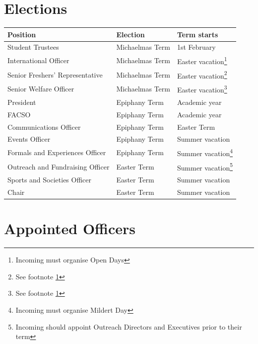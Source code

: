 \documentclass[12pt]{article}
\begin{document}
    \section{Elections}
    \begin{longtable}{|l|l|l|}
        \hline
        \textbf{Position} & \textbf{Election} & \textbf{Term starts} \\
        \hline\hline
        \endhead
        \hline
        \endfoot

        Student Trustees                        & Michaelmas Term           & 1st February \\
        International Officer                   & Michaelmas Term           & Easter vacation\footnote{\label{povds}Incoming must organise Open Days} \\
        Senior Freshers' Representative         & Michaelmas Term           & Easter vacation\footnote{See footnote \ref{povds}} \\
        Senior Welfare Officer                  & Michaelmas Term           & Easter vacation\footnote{See footnote \ref{povds}} \\

        President                               & Epiphany Term             & Academic year \\
        FACSO                                   & Epiphany Term             & Academic year \\
        Communications Officer                  & Epiphany Term             & Easter Term \\
        Events Officer                          & Epiphany Term             & Summer vacation \\
        Formals and Experiences Officer         & Epiphany Term             & Summer vacation\footnote{Incoming must organise Mildert Day} \\

        Outreach and Fundraising Officer        & Easter Term               & Summer vacation\footnote{Incoming should appoint Outreach Directors and Executives prior to their term} \\
        Sports and Societies Officer            & Easter Term               & Summer vacation \\
        Chair                                   & Easter Term               & Summer vacation \\
    \end{longtable}


    \section{Appointed Officers}
\end{document}
